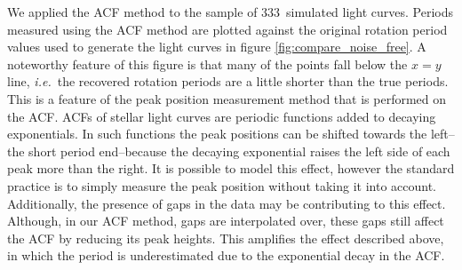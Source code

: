 \documentclass[useAMS, usenatbib, preprint, 12pt]{aastex}
\newcommand{\nlightcurves}{333}
\newcommand{\ie}{{\it i.e.}}
\begin{document}
We applied the ACF method to the sample of \nlightcurves\ simulated light
curves.
Periods measured using the ACF method are plotted against the original
rotation period values used to generate the light curves in figure
\ref{fig:compare_noise_free}.
A noteworthy feature of this figure is that many of the points fall below the
$x=y$ line, \ie\ the recovered rotation periods are a little shorter than the
true periods.
This is a feature of the peak position measurement method that is performed on
the ACF.
ACFs of stellar light curves are periodic functions added to decaying
exponentials.
In such functions the peak positions can be shifted towards the left--the
short period end--because the decaying exponential raises the left side of
each peak more than the right.
It is possible to model this effect, however the standard practice is to
simply measure the peak position without taking it into account.
Additionally, the presence of gaps in the data may be contributing to this
effect.
Although, in our ACF method, gaps are interpolated over, these gaps still
affect the ACF by reducing its peak heights.
This amplifies the effect described above, in which the period is
underestimated due to the exponential decay in the ACF.

\end{document}
